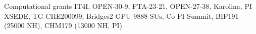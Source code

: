 \begin{rubric}{Computational grants}
%
%
  IT4I, OPEN-30-9, FTA-23-21, OPEN-27-38, Karolina, PI
\entry*[2021]%
  XSEDE, TG-CHE200099, Bridges2 GPU 9888 SUs, Co-PI
\entry*[2019, 2020 ]%
  Summit, BIP191 (25000 NH), CHM179 (13000 NH, PI) 
\end{rubric}